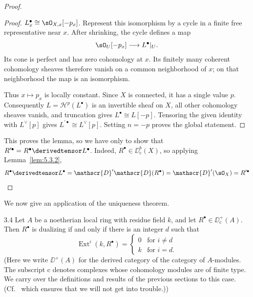 \begin{proof}
\begin{proof}
{$L_x^\bullet\cong\sO_{X,x}[-p_x]$.
Represent this isomorphism by a cycle in a finite free representative near $x$. After shrinking, the cycle defines a map
\[
\sO_U[-p_x]\longrightarrow L^\bullet|_U.
\]
Its cone is perfect and has zero cohomology at $x$. Its finitely many coherent cohomology sheaves therefore vanish on a common neighborhood of $x$; on that neighborhood the map is an isomorphism.\par
Thus $x\mapsto p_x$ is locally constant. Since $X$ is connected, it has a single value $p$. Consequently $L=\mathcal{H}^p(L^\bullet)$ is an invertible sheaf on $X$, all other cohomology sheaves vanish, and truncation gives $L^\bullet\cong L[-p]$. Tensoring the given identity with $L^\vee[p]$ gives $L^{\prime\bullet}\cong L^\vee[p]$. Setting $n=-p$ proves the global statement.}
\end{proof}

This proves the lemma, so we have only to show that $R^{\prime\bullet} = R^\bullet\derivedtensor L^{\bullet}$. Indeed, $R^\bullet\in\DD^b_{\mathrm{c}}(X)$, so applying Lemma~\ref{lem:5.3.2},
\[
R^{\bullet}\derivedtensor L^{\bullet} = \mathscr{D}'\mathscr{D}(R^{\bullet}) = \mathscr{D}'(\sO_X) = R^{\prime\bullet}
\]
\end{proof}

We now give an application of the uniqueness theorem.

\begin{bookproposition}{3.4}\label{prop:5.3.4}
Let $A$ be a noetherian local ring with residue field $k$, and let $R^\bullet\in\DD^+_{\mathrm{c}}(A)$. Then $R^\bullet$ is dualizing if and only if there is an integer $d$ such that
\[
\operatorname{Ext}^{i}(k,R^{\bullet}) = \begin{cases} 0 & \text{for } i\neq d \\ k & \text{for } i = d. \end{cases}
\]
(Here we write $\DD^+(A)$ for the derived category of the category of $A$-modules. The subscript $\mathrm{c}$ denotes complexes whose cohomology modules are of finite type. We carry over the definitions and results of the previous sections to this case. (Cf.\  which ensures that we will not get into trouble.))
\end{bookproposition}

